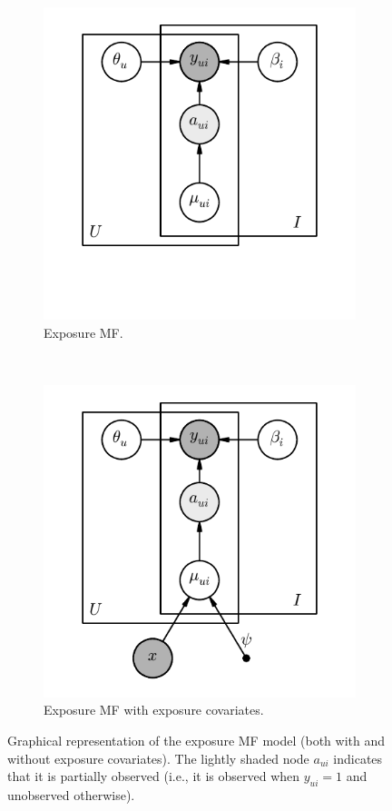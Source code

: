 \begin{figure}
  \centering
  \begin{subfigure}[t]{4in}
  \centering
  \includegraphics{fig/plate_diagram.pdf}
  \caption{Exposure MF.}
  \label{fig:plate_diagram}
  \end{subfigure}
  \\
  \begin{subfigure}[t]{4in}
  \centering
  \includegraphics{fig/plate_diagram_side_info.pdf}
  \caption{Exposure MF with exposure covariates.}
  \label{fig:plate_diagram_side_info}
  \end{subfigure}
  \caption{Graphical representation of the exposure MF model (both with and without exposure covariates). The lightly shaded node $a_{ui}$ indicates that it is partially observed (i.e., it is observed when $y_{ui} = 1$ and unobserved otherwise).}
\end{figure}

